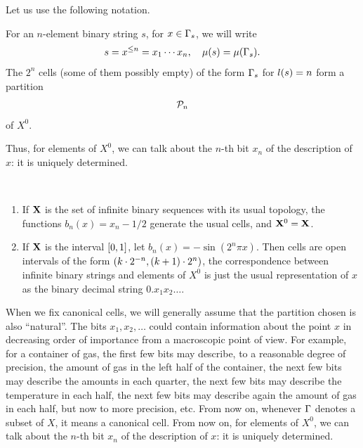 Let us use the following notation.

 \begin{definition}
  \label{def:g4.7.5}
  \notready
For an \( n \)-element binary string \( s \), for \( x \in \Gamma_{s} \), we will write 
 \[
           s = x^{\le n} =  x_1\dotsm x_n,
\quad \mu(s) = \mu(\Gamma_{s}).
 \]
The \( 2^n \) cells (some of them possibly empty)
of the form \( \Gamma_s \) for \( l(s)=n \) form a partition
 \[
  \mathcal{P}_n
 \]
  of \( X^0 \).
 \end{definition}

  Thus, for elements of \( X^0 \), we can talk about the \( n \)-th bit \( x_n \)
of the description of \( x \): it is uniquely determined.

 \begin{examples}\label{example:cells}\
 \begin{enumerate}
  \item If \( \mathbf{X} \) is the set of infinite binary sequences with its usual
topology, the functions \( b_{n}(x) = x_{n}-1/2 \) generate the usual
cells, and \( \mathbf{X}^{0}=\mathbf{X} \).
  \item If \( \mathbf{X} \) is the interval \( [0,1] \), let 
\( b_{n}(x) = -\sin(2^{n}\pi x) \).
Then cells are open 
intervals of the form \( (k\cdot 2^{-n},(k+1)\cdot 2^{n}) \),
the correspondence between infinite binary strings
and elements of \( X^0 \) is just the usual representation of \( x \) as the
binary decimal string \( 0.x_{1}x_{2}\dots \).
 \end{enumerate}
 \end{examples}

When we fix canonical cells,  
we will generally assume that the partition chosen is also
``natural''.
The bits \( x_1,x_2,\ldots \) could contain information about the
point \( x \) in decreasing order of importance from a macroscopic
point of view. 
For example, for a container of gas, the first few bits may
describe, to a reasonable degree of precision, the amount of gas in
the left half of the container, the next few bits may describe the
amounts in each quarter, the next few bits may describe the
temperature in each half, the next few bits may describe again the
amount of gas in each half, but now to more precision, etc.
From now on, whenever \( \Gamma \) denotes a subset of \( X \), it means a
canonical cell.
From now on, for elements of \( X^0 \), we can talk about the \( n \)-th
bit \( x_n \) of the description of \( x \): it is uniquely determined.

